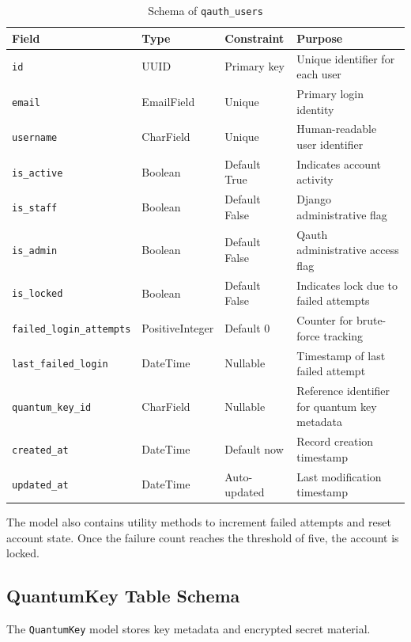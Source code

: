 \begin{table}[H]
\centering
\small
\caption{Schema of \texttt{qauth\_users}}
\label{tab:qauth-users}
\begin{tabular}{|p{3.0cm}|p{2.8cm}|p{1.8cm}|p{6.0cm}|}
\hline
\textbf{Field} & \textbf{Type} & \textbf{Constraint} & \textbf{Purpose} \\
\hline
\texttt{id} & UUID & Primary key & Unique identifier for each user \\
\hline
\texttt{email} & EmailField & Unique & Primary login identity \\
\hline
\texttt{username} & CharField & Unique & Human-readable user identifier \\
\hline
\texttt{is\_active} & Boolean & Default True & Indicates account activity \\
\hline
\texttt{is\_staff} & Boolean & Default False & Django administrative flag \\
\hline
\texttt{is\_admin} & Boolean & Default False & Qauth administrative access flag \\
\hline
\texttt{is\_locked} & Boolean & Default False & Indicates lock due to failed attempts \\
\hline
\texttt{failed\_login\_attempts} & PositiveInteger & Default 0 & Counter for brute-force tracking \\
\hline
\texttt{last\_failed\_login} & DateTime & Nullable & Timestamp of last failed attempt \\
\hline
\texttt{quantum\_key\_id} & CharField & Nullable & Reference identifier for quantum key metadata \\
\hline
\texttt{created\_at} & DateTime & Default now & Record creation timestamp \\
\hline
\texttt{updated\_at} & DateTime & Auto-updated & Last modification timestamp \\
\hline
\end{tabular}
\end{table}

The model also contains utility methods to increment failed attempts and reset account state. Once the failure count reaches the threshold of five, the account is locked.

\subsection{QuantumKey Table Schema}
The \texttt{QuantumKey} model stores key metadata and encrypted secret material.

